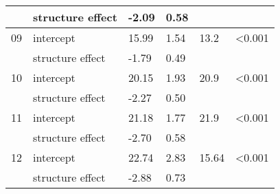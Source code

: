 \documentclass{article}
\begin{document}
\begin{table}[ht]
\begin{tabular}{|p{}|p{}|p{}p{}p{}p{}|}
    & structure effect & -2.09 & 0.58 &  &  \\ 
   \hline
09 & intercept & 15.99 & 1.54 & 13.2 & <0.001 \\ 
    & structure effect & -1.79 & 0.49 &  &  \\ 
   \hline
10 & intercept & 20.15 & 1.93 & 20.9 & <0.001 \\ 
    & structure effect & -2.27 & 0.50 &  &  \\ 
   \hline
11 & intercept & 21.18 & 1.77 & 21.9 & <0.001 \\ 
    & structure effect & -2.70 & 0.58 &  &  \\ 
   \hline
12 & intercept & 22.74 & 2.83 & 15.64 & <0.001 \\ 
    & structure effect & -2.88 & 0.73 &  &  \\ 
   \hline
\end{tabular}
\endgroup
\end{table}
\clearpage
\end{document}
